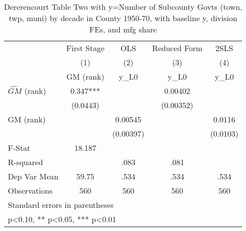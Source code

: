 \begin{table}[htbp]\centering
\def\sym#1{\ifmmode^{#1}\else\(^{#1}\)\fi}
\caption{Dererencourt Table Two with y=Number of Subcounty Govts (town, twp, muni) by decade in County 1950-70, with baseline y, division FEs, and mfg share}
\begin{tabular}{l*{4}{c}}
\toprule
                    & First Stage   &         OLS   &Reduced Form   &        2SLS   \\
                    &\multicolumn{1}{c}{(1)}&\multicolumn{1}{c}{(2)}&\multicolumn{1}{c}{(3)}&\multicolumn{1}{c}{(4)}\\
                    &\multicolumn{1}{c}{GM  (rank)}&\multicolumn{1}{c}{y\_L0}&\multicolumn{1}{c}{y\_L0}&\multicolumn{1}{c}{y\_L0}\\
\midrule
$\hat{GM}$ (rank)   &       0.347***&               &     0.00402   &               \\
                    &    (0.0443)   &               &   (0.00352)   &               \\
\addlinespace
GM  (rank)          &               &     0.00545   &               &      0.0116   \\
                    &               &   (0.00397)   &               &    (0.0103)   \\
\midrule
F-Stat              &      18.187   &               &               &               \\
R-squared           &               &        .083   &        .081   &               \\
Dep Var Mean        &       59.75   &        .534   &        .534   &        .534   \\
Observations        &         560   &         560   &         560   &         560   \\
\bottomrule
\multicolumn{5}{l}{\footnotesize Standard errors in parentheses}\\
\multicolumn{5}{l}{\footnotesize * p<0.10, ** p<0.05, *** p<0.01}\\
\end{tabular}
\end{table}
